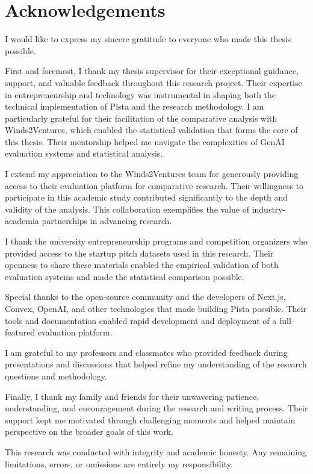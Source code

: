 \chapter*{Acknowledgements}
\label{ch:acknowledgements}

I would like to express my sincere gratitude to everyone who made this thesis possible.

First and foremost, I thank my thesis supervisor for their exceptional guidance, support, and valuable feedback throughout this research project. Their expertise in entrepreneurship and technology was instrumental in shaping both the technical implementation of Pista and the research methodology. I am particularly grateful for their facilitation of the comparative analysis with Winds2Ventures, which enabled the statistical validation that forms the core of this thesis. Their mentorship helped me navigate the complexities of GenAI evaluation systems and statistical analysis.

I extend my appreciation to the Winds2Ventures team for generously providing access to their evaluation platform for comparative research. Their willingness to participate in this academic study contributed significantly to the depth and validity of the analysis. This collaboration exemplifies the value of industry-academia partnerships in advancing research.

I thank the university entrepreneurship programs and competition organizers who provided access to the startup pitch datasets used in this research. Their openness to share these materials enabled the empirical validation of both evaluation systems and made the statistical comparison possible.

Special thanks to the open-source community and the developers of Next.js, Convex, OpenAI, and other technologies that made building Pista possible. Their tools and documentation enabled rapid development and deployment of a full-featured evaluation platform.

I am grateful to my professors and classmates who provided feedback during presentations and discussions that helped refine my understanding of the research questions and methodology.

Finally, I thank my family and friends for their unwavering patience, understanding, and encouragement during the research and writing process. Their support kept me motivated through challenging moments and helped maintain perspective on the broader goals of this work.

This research was conducted with integrity and academic honesty. Any remaining limitations, errors, or omissions are entirely my responsibility.
